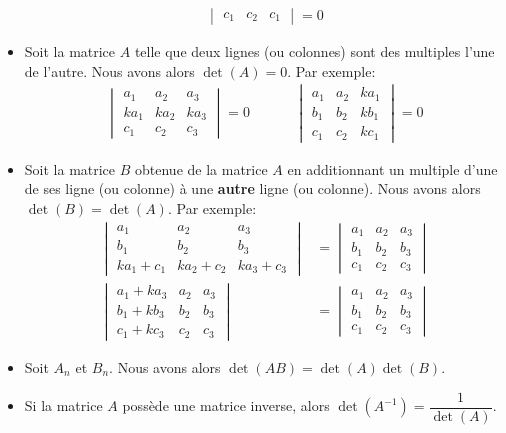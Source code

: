 \documentclass[]{book}
\theoremstyle{definition}
\theoremstyle{definition}
\theoremstyle{definition}
\theoremstyle{remark}
\begin{document}
\begin{itemize}
\begin{align*}
\begin{vmatrix}
  c_1 & c_2 & c_1
  \end{vmatrix}
  =0
  \end{align*}
\item
  Soit la matrice \(A\) telle que deux lignes (ou colonnes) sont des multiples l'une de l'autre. Nous avons alors \(\det(A)=0\). Par exemple:
  \begin{align*}
  \begin{vmatrix}
  a_1 & a_2 & a_3 \\
  ka_1 & ka_2 & ka_3 \\
  c_1 & c_2 & c_3
  \end{vmatrix}
  =
  0
  &
  \phantom{aaa}
  &
  \begin{vmatrix}
  a_1 & a_2 & ka_1 \\
  b_1 & b_2 & kb_1 \\
  c_1 & c_2 & kc_1
  \end{vmatrix}
  =0
  \end{align*}
\item
  Soit la matrice \(B\) obtenue de la matrice \(A\) en additionnant un multiple d'une de ses ligne (ou colonne) à une \textbf{autre} ligne (ou colonne). Nous avons alors \(\det(B)=\det(A)\). Par exemple:
  \begin{align*}
  \begin{vmatrix}
  a_1 & a_2 & a_3 \\
  b_1 & b_2 & b_3 \\
  ka_1+c_1 & ka_2+c_2 & ka_3+c_3
  \end{vmatrix}
  &=
  \begin{vmatrix}
  a_1 & a_2 & a_3 \\
  b_1 & b_2 & b_3 \\
  c_1 & c_2 & c_3
  \end{vmatrix}
  \\
  \begin{vmatrix}
  a_1+ka_3 & a_2 & a_3 \\
  b_1+kb_3 & b_2 & b_3 \\
  c_1+kc_3 & c_2 & c_3
  \end{vmatrix}
  &=
  \begin{vmatrix}
  a_1 & a_2 & a_3 \\
  b_1 & b_2 & b_3 \\
  c_1 & c_2 & c_3
  \end{vmatrix}
  \end{align*}
\item
  Soit \(A_n\) et \(B_n\). Nous avons alors \(\det(AB)=\det(A)\det(B)\).
\item
  Si la matrice \(A\) possède une matrice inverse, alors \(\det(A^{-1})=\dfrac{1}{\det(A)}\).
\end{itemize}
\end{document}
